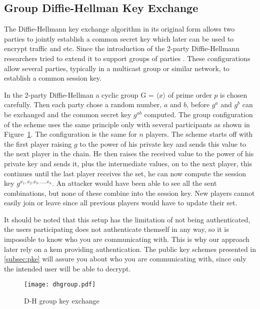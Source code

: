 \subsection{Group Diffie-Hellman Key Exchange}\label{subsec:DH}
The Diffie-Hellmann key exchange algorithm in its original form allows two parties to jointly establish a common secret key which later can be used to encrypt traffic and etc. Since the introduction of the 2-party Diffie-Hellmann researchers tried to extend it to support groups of parties \cite{steiner1996diffie, groupDH}. These configurations allow several parties, typically in a multicast group or similar network, to establish a common session key. 
\par In the 2-party Diffie-Hellman a cyclic group G =  $\langle x \rangle$ of prime order $p$ is chosen carefully. Then each party chose a random number, $a$ and $b$, before $g^a$ and $g^b$ can be exchanged and the common secret key $g^{ab}$ computed. The group configuration of the scheme uses the same principle only with several participants as shown in Figure~\ref{fig:dhgroup}. The configuration is the same for $n$ players. The scheme starts off with the first player raising $g$ to the power of his private key and sends this value to the next player in the chain. He then raises the received value to the power of his private key and sends it, plus the intermediate values, on to the next player, this continues until the last player receives the set, he can now compute the session key $g^{x_1,x_2.x_3,...,x_n}$. An attacker would have been able to see all the sent combinations, but none of these combine into the session key. New players cannot easily join or leave since all previous players would have to update their set. 
\par It should be noted that this setup has the limitation of not being authenticated, the users participating does not authenticate themself in any way, so it is impossible to know who you are communicating with. This is why our approach later rely on a \gls{kem} providing authentication. The public key schemes presented in \ref{subsec:pke} will assure you about who you are communicating with, since only the intended user will be able to decrypt. 

\begin{figure}
\centering
\texttt{[image: dhgroup.pdf]}
\caption{D-H group key exchange}
\label{fig:dhgroup}
\end{figure}



